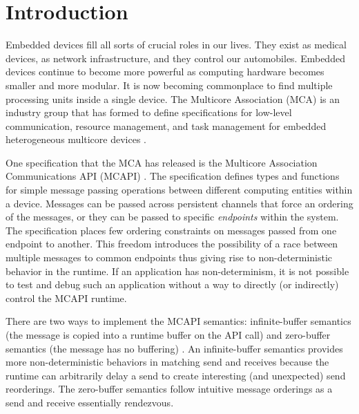 \section{Introduction}
Embedded devices fill all sorts of crucial roles in our lives. They exist as
medical devices, as network infrastructure, and they control our automobiles.
Embedded devices continue to become more powerful as computing hardware becomes
smaller and more modular. It is now becoming commonplace to find multiple
processing units inside a single device. The Multicore Association (MCA) is an
industry group that has formed to define specifications for low-level
communication, resource management, and task management for embedded heterogeneous
multicore devices \cite{mca}.

One specification that the MCA has released is the Multicore
Association Communications API (MCAPI) \cite{mcapi}. The specification
defines types and functions for simple message passing operations between different
computing entities within a device. Messages can be passed across
persistent channels that force an ordering of the messages, or they
can be passed to specific \emph{endpoints} within the system. The
specification places few ordering constraints on messages passed from
one endpoint to another. This freedom introduces the possibility of a race between multiple messages to common endpoints thus giving rise to non-deterministic behavior in the runtime\cite{netzer:spdt96}. If an
application has non-determinism, it is not possible
to test and debug such an application without a way to directly (or
indirectly) control the MCAPI runtime.

There are two ways to implement the MCAPI semantics: infinite-buffer
semantics (the message is copied into a runtime buffer on the API
call) and zero-buffer semantics (the message has no buffering)
\cite{sarvani:fm09}.  An infinite-buffer semantics provides more
non-deterministic behaviors in matching send and receives because the
runtime can arbitrarily delay a send to create interesting (and
unexpected) send reorderings. The zero-buffer semantics follow
intuitive message orderings as a send and receive essentially
rendezvous.


